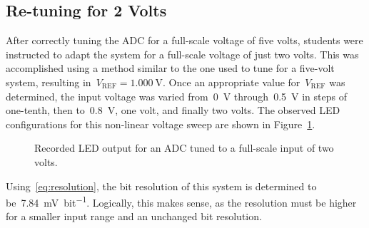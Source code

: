 \subsection{Re-tuning for 2 Volts}
After correctly tuning the ADC for a full-scale voltage of five volts, students were instructed to adapt the system for a full-scale voltage of just two volts.  This was accomplished using a method similar to the one used to tune for a five-volt system, resulting in~$V_\text{REF} = \SI{1.000}{\volt}$.  Once an appropriate value for~$V_\text{REF}$ was determined, the input voltage was varied from~\SI{0}{\volt} through~\SI{0.5}{\volt} in steps of one-tenth, then to~\SI{0.8}{\volt}, one volt, and finally two volts.  The observed LED configurations for this non-linear voltage sweep are shown in Figure~\ref{fig:pt6bars}.
%
\begin{figure}[H]
	\centering
	
	\parbox{.6\textwidth}{
	\caption[LED output for tuned ADC; $V_\text{FS} = \SI{2}{\volt}$]{Recorded LED output for an ADC tuned to a full-scale input of two volts.}
	\label{fig:pt6bars}}
\end{figure}
%
Using~\eqref{eq:resolution}, the bit resolution of this system is determined to be~\SI{7.84}{\milli\volt\per bit}.  Logically, this makes sense, as the resolution must be higher for a smaller input range and an unchanged bit resolution.
